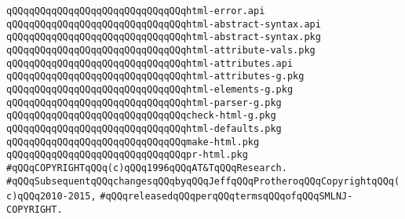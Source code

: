 \newline
\verb|qQQqqQQqqQQqqQQqqQQqqQQqqQQqqQQqhtml-error.api|\newline
\verb|qQQqqQQqqQQqqQQqqQQqqQQqqQQqqQQqhtml-abstract-syntax.api|\newline
\verb|qQQqqQQqqQQqqQQqqQQqqQQqqQQqqQQqhtml-abstract-syntax.pkg|\newline
\verb|qQQqqQQqqQQqqQQqqQQqqQQqqQQqqQQqhtml-attribute-vals.pkg|\newline
\verb|qQQqqQQqqQQqqQQqqQQqqQQqqQQqqQQqhtml-attributes.api|\newline
\verb|qQQqqQQqqQQqqQQqqQQqqQQqqQQqqQQqhtml-attributes-g.pkg|\newline
\verb|qQQqqQQqqQQqqQQqqQQqqQQqqQQqqQQqhtml-elements-g.pkg|\newline
\verb|qQQqqQQqqQQqqQQqqQQqqQQqqQQqqQQqhtml-parser-g.pkg|\newline
\verb|qQQqqQQqqQQqqQQqqQQqqQQqqQQqqQQqcheck-html-g.pkg|\newline
\verb|qQQqqQQqqQQqqQQqqQQqqQQqqQQqqQQqhtml-defaults.pkg|\newline
\verb|qQQqqQQqqQQqqQQqqQQqqQQqqQQqqQQqmake-html.pkg|\newline
\verb|qQQqqQQqqQQqqQQqqQQqqQQqqQQqqQQqpr-html.pkg|\newline
\newline
\newline
\newline
\verb|#qQQqCOPYRIGHTqQQq(c)qQQq1996qQQqAT&TqQQqResearch.|\newline
\verb|#qQQqSubsequentqQQqchangesqQQqbyqQQqJeffqQQqProtheroqQQqCopyrightqQQq(c)qQQq2010-2015,|\newline
\verb|#qQQqreleasedqQQqperqQQqtermsqQQqofqQQqSMLNJ-COPYRIGHT.|\newline

